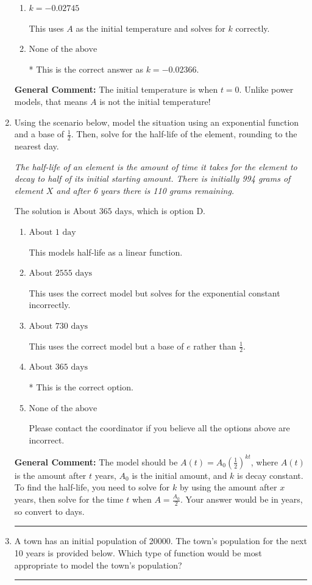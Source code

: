 \documentclass{extbook}[14pt]
\newcommand{\litem}[1]{\item #1

\rule{\textwidth}{0.4pt}}
\begin{document}
\begin{enumerate}
{\begin{enumerate}[label=\Alph*.]
This uses $A$ as the initial temperature and solves for $k$ incorrectly.
\item \( k = -0.02745 \)

This uses $A$ as the initial temperature and solves for $k$ correctly.
\item \( \text{None of the above} \)

* This is the correct answer as $k = -0.02366$.
\end{enumerate}

\textbf{General Comment:} The initial temperature is when $t = 0$. Unlike power models, that means $A$ is not the initial temperature!
}
\litem{
Using the scenario below, model the situation using an exponential function and a base of $\frac{1}{2}$. Then, solve for the half-life of the element, rounding to the nearest day.

\begin{center}
    \textit{ The half-life of an element is the amount of time it takes for the element to decay to half of its initial starting amount. There is initially 994 grams of element $X$ and after 6 years there is 110 grams remaining. }
\end{center}
The solution is \( \text{About } 365 \text{ days} \), which is option D.\begin{enumerate}[label=\Alph*.]
\item \( \text{About } 1 \text{ day} \)

This models half-life as a linear function.
\item \( \text{About } 2555 \text{ days} \)

This uses the correct model but solves for the exponential constant incorrectly.
\item \( \text{About } 730 \text{ days} \)

This uses the correct model but a base of $e$ rather than $\frac{1}{2}$.
\item \( \text{About } 365 \text{ days} \)

* This is the correct option.
\item \( \text{None of the above} \)

Please contact the coordinator if you believe all the options above are incorrect.
\end{enumerate}

\textbf{General Comment:} The model should be $A(t) = A_0 (\frac{1}{2})^{kt}$, where $A(t)$ is the amount after $t$ years, $A_0$ is the initial amount, and $k$ is decay constant. To find the half-life, you need to solve for $k$ by using the amount after $x$ years, then solve for the time $t$ when $A = \frac{A_0}{2}$. Your answer would be in years, so convert to days.
}
\litem{
A town has an initial population of 20000. The town's population for the next 10 years is provided below. Which type of function would be most appropriate to model the town's population?


}
\end{enumerate}
\end{document}
